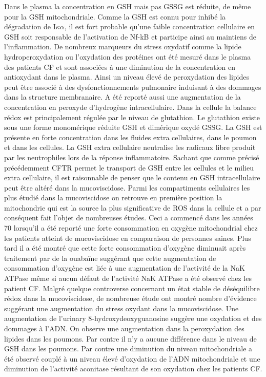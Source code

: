 Dans le plasma la concentration en GSH mais pas GSSG est réduite, de même pour la GSH mitochondriale. Comme la GSH est connu pour inhibé la dégradation de I$\kappa$$\alpha$, il est fort probable qu’une faible concentration cellulaire en GSH soit responsable de l’activation de Nf-kB et participe ainsi au maintiens de l’inflammation. 
De nombreux marqueurs du stress oxydatif comme la lipide hydroperoxydation ou l’oxydation des protéines ont été mesuré dans le plasma des patients CF et sont associées à une diminution de la concentration en antioxydant dans le plasma. Ainsi un niveau élevé de peroxydation des lipides peut être associé à des dysfonctionnements pulmonaire induisant à des dommages dans la structure membranaire. A été reporté aussi une augmentation de la concentration en peroxyde d’hydrogène intracellulaire.
Dans la cellule la balance rédox est principalement régulée par le niveau de glutathion. Le glutathion existe sous une forme monomérique réduite GSH et dimérique oxydé GSSG. La GSH est présente en forte concentration dans les fluides extra cellulaires, dans le poumon et dans les cellules. La GSH extra cellulaire neutralise les radicaux libre produit par les neutrophiles lors de la réponse inflammatoire. Sachant que comme précisé précédemment CFTR permet le transport de GSH entre les cellules et le milieu extra cellulaire, il est raisonnable de penser que le contenu en GSH intracellulaire peut être altéré dans la mucoviscidose.
Parmi les compartiments cellulaires les plus étudié dans la mucoviscidose on retrouve en première position la mitochondrie qui est la source la plus significative de ROS dans la cellule et a par conséquent fait l’objet de nombreuses études. Ceci a commencé dans les années 70 lorsqu’il a été reporté une forte consommation en oxygène mitochondrial chez les patients atteint de mucoviscidose en comparaison de personnes saines. Plus tard il a été montré que cette forte consommation d’oxygène diminuait après traitement par de la ouabaïne suggérant que cette augmentation de consommation d’oxygène est liée à une augmentation de l’activité de la NaK ATPase même si aucun défaut de l’activité NaK ATPase a été observé chez les patient CF. Malgré quelque controverse concernant un état stable de déséquilibre rédox dans la mucoviscidose, de nombreuse étude ont montré nombre d’évidence suggérant une augmentation du stress oxydant dans la mucoviscidose.
Une augmentation de l’urinary 8-hydroxydeoxyguanosine suggère une oxydation et des dommages à l’ADN. On observe une augmentation dans la peroxydation des lipides dans les poumons. Par contre il n’y a aucune différence dans le niveau de GSH dans les poumons. Par contre une diminution du niveau mitochondriale a été observé couplé à un niveau élevé d’oxydation de l’ADN mitochondriale et une diminution de l’activité aconitase résultant de son oxydation chez les patients CF. 
$$
